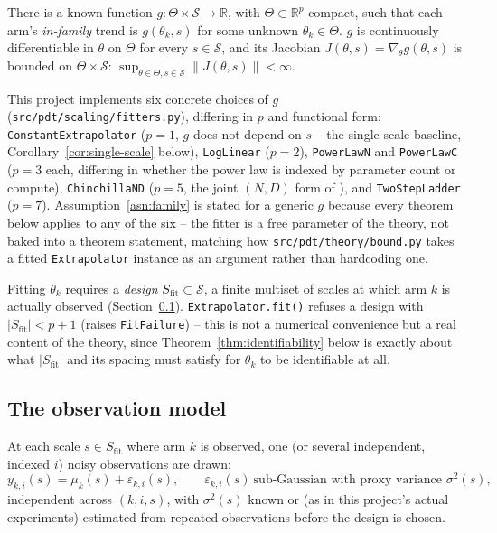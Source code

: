 \begin{assumption}
\label{asn:family}
There is a known function $g: \Theta \times \mathcal{S} \to \mathbb{R}$, with
$\Theta \subset \mathbb{R}^p$ compact, such that each arm's \emph{in-family} trend is
$g(\theta_k, s)$ for some unknown $\theta_k \in \Theta$. $g$ is continuously
differentiable in $\theta$ on $\Theta$ for every $s \in \mathcal{S}$, and its Jacobian
$J(\theta, s) = \nabla_\theta g(\theta, s)$ is bounded on $\Theta \times \mathcal{S}$:
$\sup_{\theta \in \Theta, s \in \mathcal{S}} \lVert J(\theta, s) \rVert < \infty$.
\end{assumption}

This project implements six concrete choices of $g$ (\texttt{src/pdt/scaling/fitters.py}),
differing in $p$ and functional form:
\texttt{ConstantExtrapolator} ($p = 1$, $g$ does not depend on $s$ -- the single-scale
baseline, Corollary~\ref{cor:single-scale} below), \texttt{LogLinear} ($p = 2$),
\texttt{PowerLawN} and \texttt{PowerLawC} ($p = 3$ each, differing in whether the power
law is indexed by parameter count or compute), \texttt{ChinchillaND} ($p = 5$, the joint
$(N, D)$ form of \citet{hoffmann2022chinchilla}), and \texttt{TwoStepLadder} ($p = 7$).
Assumption~\ref{asn:family} is stated for a generic $g$ because every theorem below
applies to any of the six -- the fitter is a free parameter of the theory, not baked
into a theorem statement, matching how \texttt{src/pdt/theory/bound.py} takes a fitted
\texttt{Extrapolator} instance as an argument rather than hardcoding one.

Fitting $\theta_k$ requires a \emph{design} $S_{\mathrm{fit}} \subset \mathcal{S}$, a
finite multiset of scales at which arm $k$ is actually observed
(Section~\ref{sec:setup-obs}). \texttt{Extrapolator.fit()} refuses a design with
$|S_{\mathrm{fit}}| < p + 1$ (raises \texttt{FitFailure}) -- this is not a numerical
convenience but a real content of the theory, since Theorem~\ref{thm:identifiability}
below is exactly about what $|S_{\mathrm{fit}}|$ and its spacing must satisfy for
$\theta_k$ to be identifiable at all.

\subsection{The observation model}
\label{sec:setup-obs}

\begin{assumption}
\label{asn:noise}
At each scale $s \in S_{\mathrm{fit}}$ where arm $k$ is observed, one (or several
independent, indexed $i$) noisy observations are drawn:
\[
  y_{k, i}(s) = \mu_k(s) + \varepsilon_{k, i}(s), \qquad
  \varepsilon_{k, i}(s) \ \text{sub-Gaussian with proxy variance } \sigma^2(s),
\]
independent across $(k, i, s)$, with $\sigma^2(s)$ known or (as in this project's actual
experiments) estimated from repeated observations before the design is chosen.
\end{assumption}

